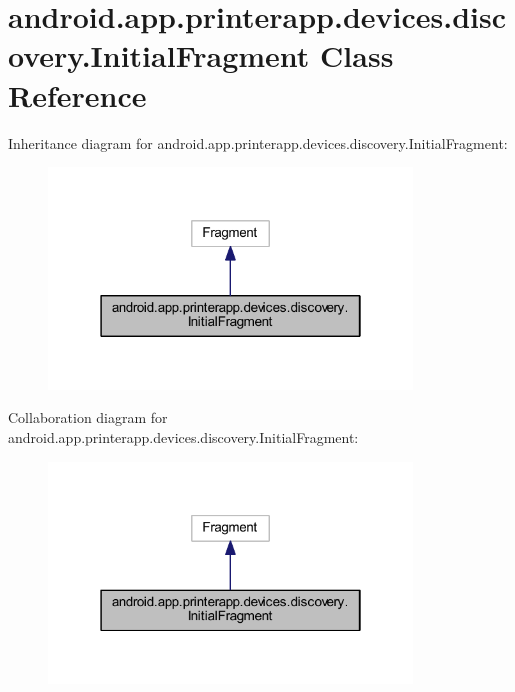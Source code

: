 \hypertarget{classandroid_1_1app_1_1printerapp_1_1devices_1_1discovery_1_1_initial_fragment}{}\section{android.\+app.\+printerapp.\+devices.\+discovery.\+Initial\+Fragment Class Reference}
\label{classandroid_1_1app_1_1printerapp_1_1devices_1_1discovery_1_1_initial_fragment}


Inheritance diagram for android.\+app.\+printerapp.\+devices.\+discovery.\+Initial\+Fragment\+:
\nopagebreak
\begin{figure}[H]
\begin{center}
\leavevmode
\includegraphics[width=274pt]{classandroid_1_1app_1_1printerapp_1_1devices_1_1discovery_1_1_initial_fragment__inherit__graph}
\end{center}
\end{figure}


Collaboration diagram for android.\+app.\+printerapp.\+devices.\+discovery.\+Initial\+Fragment\+:
\nopagebreak
\begin{figure}[H]
\begin{center}
\leavevmode
\includegraphics[width=274pt]{classandroid_1_1app_1_1printerapp_1_1devices_1_1discovery_1_1_initial_fragment__coll__graph}
\end{center}
\end{figure}

